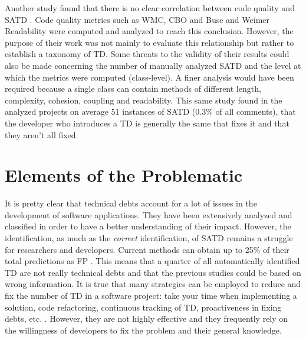 Another study found that there is no clear correlation between code quality and \ac{SATD} \citep{BavotaR16}. Code quality metrics such as \ac{WMC}, \ac{CBO} and Buse and Weimer Readability \citep{Buse:tse2010} were computed and analyzed to reach this conclusion. However, the purpose of their work was not mainly to evaluate this relationship but rather to establish a taxonomy of \ac{TD}. Some threats to the validity of their results could also be made concerning the number of manually analyzed \ac{SATD} and the level at which the metrics were computed (class-level). A finer analysis would have been required because a single class can contain methods of different length, complexity, cohesion, coupling and readability. This same study found in the analyzed projects on average 51 instances of \ac{SATD} (0.3\% of all comments), that the developer who introduces a \ac{TD} is generally the same that fixes it and that they aren't all fixed. \par


\section{Elements of the Problematic}  


It is pretty clear that technical debts account for a lot of issues in the development of software applications. They have been extensively analyzed and classified in order to have a better understanding of their impact. However, the identification, as much as the \emph{correct} identification, of \ac{SATD} remains a struggle for researchers and developers. Current methods can obtain up to 25\% of their total predictions as \ac{FP} \citep{BavotaR16}. This means that a quarter of all automatically identified \ac{TD} are not really technical debts and that the previous studies could be based on wrong information. It is true that many strategies can be employed to reduce and fix the number of \ac{TD} in a software project: take your time when implementing a solution, code refactoring, continuous tracking of \ac{TD}, proactiveness in fixing debts, etc. \citep{Ambler}. However, they are not highly effective and they frequently rely on the willingness of developers to fix the problem and their general knowledge. \par


